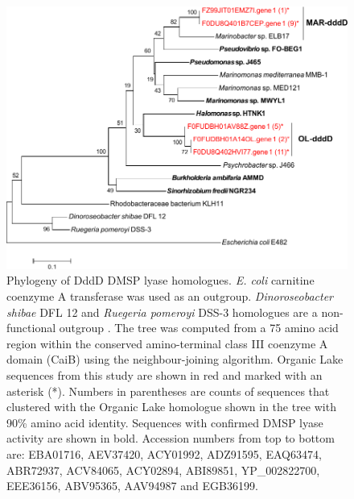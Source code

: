 \begin{figure}
\includegraphics[width=\textwidth]{orglake_figures/dddD_tree.pdf}
\caption[Phylogeny of DddD DMSP lyase homologues]{Phylogeny of DddD DMSP lyase homologues. \emph{E. coli} carnitine coenzyme A transferase was used as an outgroup. \emph{Dinoroseobacter shibae} DFL 12 and \emph{Ruegeria pomeroyi} DSS-3 homologues are a non-functional outgroup \cite{Todd2011}. The tree was computed from a 75 amino acid region within the conserved amino-terminal class III coenzyme A domain (CaiB) using the neighbour-joining algorithm. Organic Lake sequences from this study are shown in red and marked with an asterisk (*). Numbers in parentheses are counts of sequences that clustered with the Organic Lake homologue shown in the tree with 90\% amino acid identity. Sequences with confirmed DMSP lyase activity are shown in bold. Accession numbers from top to bottom are: EBA01716, AEV37420, ACY01992, ADZ91595, EAQ63474, ABR72937, ACV84065, ACY02894, ABI89851, YP\_002822700, EEE36156, ABV95365, AAV94987 and EGB36199.}
\label{fig:dddD_tree}

\end{figure}
